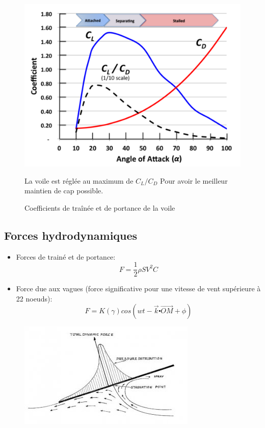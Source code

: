 \documentclass{beamer}
\begin{document}
\begin{frame}[plain]
\begin{figure}
\includegraphics[scale=0.45]{LDcoefficients.png} 
\caption{Coefficients de traînée et de portance de la voile}
La voile est réglée au maximum de $C_{L}/C_{D}$ Pour avoir le meilleur maintien de cap possible.
\end{figure}
\end{frame}

\subsection{Forces hydrodynamiques}

\begin{frame}[plain]
\begin{itemize}
\item Forces de trainé et de portance:
\[ F = \frac{1}{2}\rho S V^{2} C \]
\item Force due aux vagues (force significative pour une vitesse de vent supérieure à 22 noeuds):
\[ F = K(\gamma)cos(wt - \vec{k} \centerdot \vec{OM} + \phi) \]

\end{itemize}
\begin{figure}
\includegraphics[scale=0.7]{planing.jpg} 
\end{figure}
\end{frame}
\end{document}
